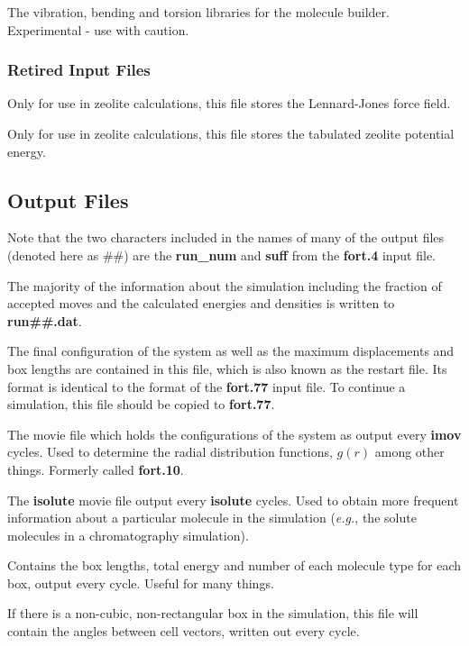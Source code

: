 \documentclass[12pt,letterpaper]{article}
\begin{document}
{{{{{{{
The vibration, bending and torsion libraries for the molecule builder.
Experimental - use with caution.

\subsubsection{Retired Input Files}

Only for use in zeolite calculations, this file stores the Lennard-Jones force field.

Only for use in zeolite calculations, this file stores the tabulated zeolite potential energy.

\subsection{Output Files}
\label{output}

Note that the two characters included in the names of many of the output files (denoted here as \#\#)
are the {\bf run\_num} and {\bf suff} from the {\bf fort.4} input file.

 The majority of the information about the simulation including 
the fraction of accepted moves and the calculated energies and densities is written to {\bf run\#\#.dat}.  

The final configuration of the system as well as the maximum displacements and box lengths 
are contained in this file, which is also known as the restart file.  Its format is identical to the format of the
{\bf fort.77} input file.  To continue a simulation, this file should be copied to {\bf fort.77}.

The movie file which holds the configurations of the system as output
every {\bf imov} cycles.  Used to determine the radial distribution
functions, $g(r)$ among other things.  Formerly called {\bf fort.10}.

The {\bf isolute} movie file output every {\bf isolute} cycles.  
Used to obtain more frequent information about a particular molecule in the simulation 
({\it e.g.}, the solute molecules in a chromatography simulation).

Contains the box lengths, total energy and number of each molecule
type for each box, output every cycle.  Useful for many things.

If there is a non-cubic, non-rectangular box in the simulation, this
file will contain the angles between cell vectors, written out every
cycle.

}}}}}}}
\end{document}
